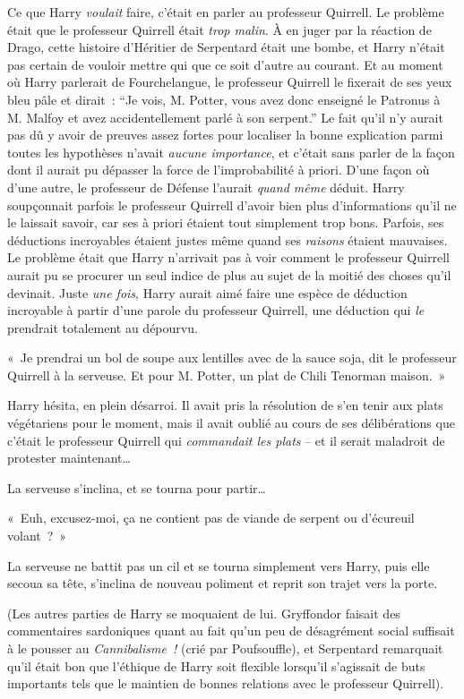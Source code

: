 Ce que Harry \emph{voulait} faire, c'était en parler au professeur Quirrell.
Le problème était que le professeur Quirrell était \emph{trop malin}.
À en juger par la réaction de Drago, cette histoire d'Héritier de Serpentard était une bombe, et Harry n'était pas certain de vouloir mettre qui que ce soit d'autre au courant.
Et au moment où Harry parlerait de Fourchelangue, le professeur Quirrell le fixerait de ses yeux bleu pâle et dirait~: “Je vois, M. Potter, vous avez donc enseigné le Patronus à M. Malfoy et avez accidentellement parlé à son serpent.”
Le fait qu'il n'y aurait pas dû y avoir de preuves assez fortes pour localiser la bonne explication parmi toutes les hypothèses n'avait \emph{aucune importance}, et c'était sans parler de la façon dont il aurait pu dépasser la force de l'improbabilité à priori.
D'une façon où d'une autre, le professeur de Défense l'aurait \emph{quand même} déduit.
Harry soupçonnait parfois le professeur Quirrell d'avoir bien plus d'informations qu'il ne le laissait savoir, car ses à priori étaient tout simplement trop bons.
Parfois, ses déductions incroyables étaient justes même quand ses \emph{raisons} étaient mauvaises.
Le problème était que Harry n'arrivait pas à voir comment le professeur Quirrell aurait pu se procurer un seul indice de plus au sujet de la moitié des choses qu'il devinait.
Juste \emph{une fois}, Harry aurait aimé faire une espèce de déduction incroyable à partir d'une parole du professeur Quirrell, une déduction qui \emph{le} prendrait totalement au dépourvu.

\later

«~Je prendrai un bol de soupe aux lentilles avec de la sauce soja, dit le professeur Quirrell à la serveuse.
Et pour M. Potter, un plat de Chili Tenorman maison.~»

Harry hésita, en plein désarroi.
Il avait pris la résolution de s'en tenir aux plats végétariens pour le moment, mais il avait oublié au cours de ses délibérations que c'était le professeur Quirrell qui \emph{commandait les plats} -- et il serait maladroit de protester maintenant…

La serveuse s'inclina, et se tourna pour partir…

«~Euh, excusez-moi, ça ne contient pas de viande de serpent ou d'écureuil volant~?~»

La serveuse ne battit pas un cil et se tourna simplement vers Harry, puis elle secoua sa tête, s'inclina de nouveau poliment et reprit son trajet vers la porte.

(Les autres parties de Harry se moquaient de lui.
Gryffondor faisait des commentaires sardoniques quant au fait qu'un peu de désagrément social suffisait à le pousser au \emph{Cannibalisme~!} (crié par Poufsouffle), et Serpentard remarquait qu'il était bon que l'éthique de Harry soit flexible lorsqu'il s'agissait de buts importants tels que le maintien de bonnes relations avec le professeur Quirrell).

